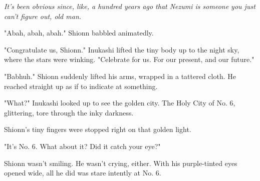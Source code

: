 \emph{It's been obvious since, like, a hundred years ago that Nezumi is
someone you just can't figure out, old man.}

"Abah, abah, abah." Shionn babbled animatedly.

"Congratulate us, Shionn." Inukashi lifted the tiny body up to the night
sky, where the stars were winking. "Celebrate for us. For our present,
and our future."

"Babhuh." Shionn suddenly lifted his arms, wrapped in a tattered cloth.
He reached straight up as if to indicate at something.

"What?" Inukashi looked up to see the golden city. The Holy City of No.
6, glittering, tore through the inky darkness.

Shionn's tiny fingers were stopped right on that golden light.

"It's No. 6. What about it? Did it catch your eye?"

Shionn wasn't smiling. He wasn't crying, either. With his purple-tinted
eyes opened wide, all he did was stare intently at No. 6.